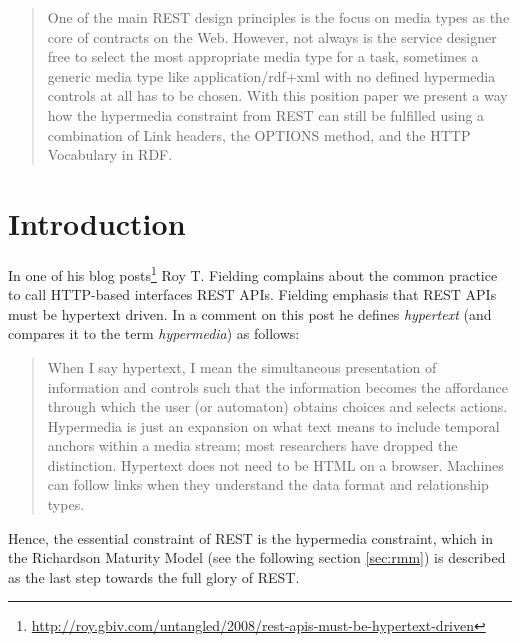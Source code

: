 \documentclass{acm_proc_article-sp}
\begin{document}
\maketitle
\begin{abstract}
One of the main REST design principles is the focus on media types as the core of contracts on the Web. However, not always is the service designer free to select the most appropriate media type for a task, sometimes a generic media type like application/rdf+xml with no defined hypermedia controls at all has to be chosen. With this position paper we present a way how the hypermedia constraint from REST can still be fulfilled using a combination of Link headers, the OPTIONS method, and the HTTP Vocabulary in RDF. 
\end{abstract}




\section{Introduction}\label{sec:introduction}
In one of his blog posts\footnote{\url{http://roy.gbiv.com/untangled/2008/rest-apis-must-be-hypertext-driven}} Roy T. Fielding complains about the common practice to call HTTP-based interfaces REST APIs. Fielding emphasis that REST APIs must be hypertext driven. In a comment on this post he defines \textit{hypertext} (and compares it to the term \textit{hypermedia}) as follows:
\begin{quote}
When I say hypertext, I mean the simultaneous presentation of information and controls such that the information becomes the affordance through which the user (or automaton) obtains choices and selects actions. Hypermedia is just an expansion on what text means to include temporal anchors within a media stream; most researchers have dropped the distinction. Hypertext does not need to be HTML on a browser. Machines can follow links when they understand the data format and relationship types.
\end{quote}
Hence, the essential constraint of REST is the hypermedia constraint, which in the Richardson Maturity Model (see the following section \ref{sec:rmm}) is described as the last step towards the full glory of REST.
\end{document}

